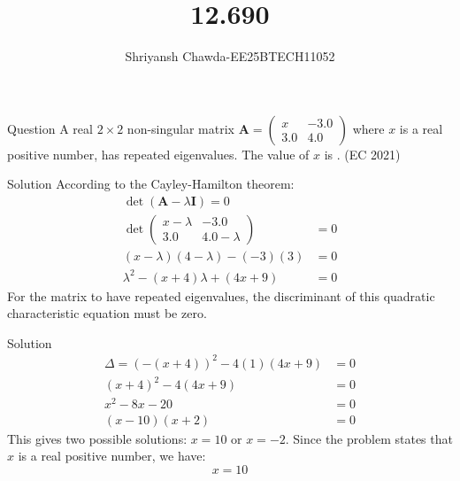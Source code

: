 \documentclass{beamer}
\title{12.690}
\author{Shriyansh Chawda-EE25BTECH11052}
\newcommand{\myvec}[1]{\ensuremath{\begin{pmatrix}#1\end{pmatrix}}}
\begin{document}
	
	\frame{\titlepage}
	
	\begin{frame}{Question}
		A real $2 \times 2$ non-singular matrix $\mathbf{A} = \begin{pmatrix} x & -3.0 \\ 3.0 & 4.0 \end{pmatrix}$ where $x$ is a real positive number, has repeated eigenvalues. The value of $x$ is \underline{\hspace{2cm}}. \hfill (EC 2021)	\\
	\end{frame}
	
	\begin{frame}{Solution}
According to the Cayley-Hamilton theorem:
\begin{align}
	\det(\mathbf{A} - \lambda\mathbf{I}) = 0\\
	\det\myvec{x - \lambda & -3.0 \\ 3.0 & 4.0 - \lambda} &= 0 \\
	(x-\lambda)(4-\lambda) - (-3)(3) &= 0 \\
	\lambda^2 - (x+4)\lambda + (4x+9) &= 0
\end{align}
For the matrix to have repeated eigenvalues, the discriminant of this quadratic characteristic equation must be zero.
	\end{frame}
	
	\begin{frame}{Solution}
\begin{align}
	\Delta = (-(x+4))^2 - 4(1)(4x+9) &= 0 \\
	(x+4)^2 - 4(4x+9) &= 0 \\
	x^2 - 8x - 20 &= 0\\
	(x-10)(x+2) &= 0
\end{align}
This gives two possible solutions: $x=10$ or $x=-2$. Since the problem states that $x$ is a real positive number, we have:
$$ x = 10 $$	

	\end{frame}
	
 
\end{document}
